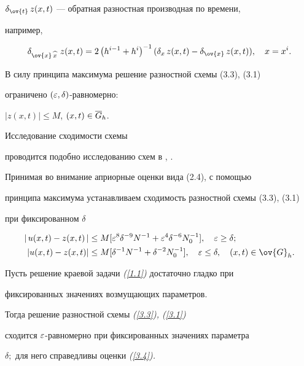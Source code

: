 $\de_{\ov{t}}\,z(x,t)$ --- обратная разностная производная по времени,


например,


$$


\de_{\ov{x}\,\widehat{x}}\,\,z(x,t)=2\left(h^{i-1}+h^i\right)^{-1}


(\de_x\,z(x,t)-\de_{\ov{x}}\,z(x,t)), \quad x=x^i.


$$





В силу принципа максимума решение разностной схемы (3.3), (3.1)


ограничено $(\varepsilon,\delta)$-равномерно:


$|z(x,t)| \le M$, $(x,t)\in\overline{G}_h$.


Исследование сходимости схемы 


проводится подобно исследованию схем в \cite{Sh1}, \cite{Sh5}. 





Принимая во внимание априорные оценки вида (2.4), с помощью 


принципа максимума устанавливаем сходимость разностной схемы (3.3), (3.1) 


при фиксированном $\delta$


\begin{align}\label{3.4}


|\,u(x,t)-z(x,t)\,|&\le M[\eps^8\de^{-9}N^{-1}+\eps^4\de^{-6}


N_0^{-1}],\quad \eps\ge\de;\\


%


|u(x,t)-z(x,t)|&\le M[\delta^{-1}N^{-1}+\delta^{-2} N_0^{-1}],\quad 


\eps\le \de,\quad (x,t)\in\ov{G}_h.\notag


\end{align}





\begin{thmm}\label{th1}


Пусть решение краевой задачи {\em (\ref{1.1})} достаточно гладко при 


фиксированных значениях возмущающих параметров. 


Тогда решение разностной схемы {\em (\ref{3.3}), (\ref{3.1})}


сходится $\varepsilon$-равномерно при фиксированных значениях параметра


$\delta;$ для него справедливы оценки {\em (\ref{3.4}).}


\end{thmm} 





